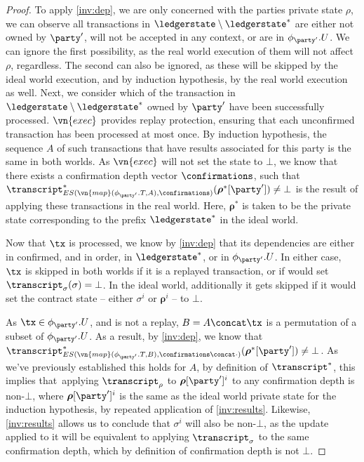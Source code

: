 \begin{proof}
  To apply \ref{inv:dep}, we are only concerned with the parties private
  state $\rho$, we can observe all transactions in $\ledgerstate \setminus
  \ledgerstate^*$ are either not owned by $\party'$, will not be accepted in any
  context, or are in $\phi_{\party'}.U$. We can ignore the first possibility, as
  the real world execution of them will not affect $\rho$, regardless. The
  second can also be ignored, as these will be skipped by the ideal world
  execution, and by induction hypothesis, by the real world execution as well.
  Next, we consider which of the transaction in $\ledgerstate \setminus
  \ledgerstate^*$ owned by $\party'$ have been successfully processed.
  $\vn{exec}$ provides replay protection, ensuring that each unconfirmed
  transaction has been processed at most once. By induction hypothesis, the
  sequence $A$ of such transactions that have results associated for this
  party is the same in both worlds.
  As $\vn{exec}$ will not set the state to $\bot$, we know that there
    exists a confirmation depth vector $\confirmations$, such that
  $\transcript^*_{ES(\vn{map}(\phi_{\party'}.T, A), \confirmations)}(\boldsymbol\rho^*[\party'])
  \neq \bot$ is the result of applying these transactions in the real world. Here,
  $\boldsymbol\rho^*$ is taken to be the private state
  corresponding to the prefix $\ledgerstate^*$ in the ideal world.

  Now that $\tx$ is processed, we know by \ref{inv:dep} that its dependencies
  are either in confirmed, and in order, in $\ledgerstate^*$, or in
  $\phi_{\party'}.U$. In either case, $\tx$ is skipped in both worlds if it is a
  replayed transaction, or if would set $\transcript_\sigma(\sigma) = \bot$. In
  the ideal world, additionally it gets skipped if it would set the contract
  state -- either $\sigma^i$ or $\boldsymbol\rho^i$ -- to $\bot$.

  As $\tx \in \phi_{\party'}.U$, and is not a replay, $B = A \concat \tx$ is a
  permutation of a subset of $\phi_{\party'}.U$. As a result, by \ref{inv:dep},
  we know that $\transcript^*_{ES(\vn{map}(\phi_{\party'}.T,
    B), \confirmations \concat \cdot)}(\boldsymbol\rho^*[\party']) \neq \bot$. As we've previously established
  this holds for $A$, by definition of $\transcript^*$, this implies that\ 
  applying $\transcript_\rho$ to $\boldsymbol\rho[\party']^i$ to any
    confirmation depth is non-$\bot$, where
  $\boldsymbol\rho[\party']^{i}$ is the same as the ideal world private state for
  the induction hypothesis, by repeated application of \ref{inv:results}.
  Likewise, \ref{inv:results} allows us to conclude that $\sigma^i$ will also be
  non-$\bot$, as the update applied to it will be equivalent to applying
    $\transcript_\sigma$ to the same confirmation depth, which by definition of
    confirmation depth is not $\bot$.
  

\end{proof}

